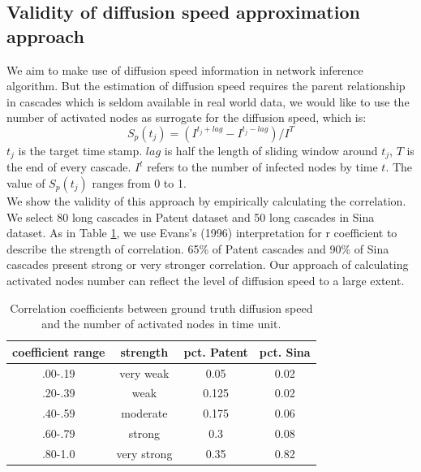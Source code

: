 \subsection{Validity of diffusion speed approximation approach}
We aim to make use of diffusion speed information in network inference algorithm. But the estimation of diffusion speed requires the parent relationship in cascades which is seldom available in real world data, we would like to use the number of activated nodes as surrogate for the diffusion speed, which is:
\begin{equation}
S_p(t_j)=(I^{t_j+lag}-I^{t_j-lag})/I^T
\end{equation}
$t_j$ is the target time stamp. $lag$ is half the length of sliding window around $t_j$, $T$ is the end of every cascade. $I^t$ refers to the number of infected nodes by time $t$. The value of $S_p(t_j)$ ranges from 0 to 1.
\\We show the validity of this approach by empirically calculating the correlation. We select 80 long cascades in Patent dataset and 50 long cascades in Sina dataset. As in Table \ref{tab:Corre}, we use Evans's (1996) interpretation for r coefficient to describe the strength of correlation. 65\% of Patent cascades and 90\% of Sina cascades present strong or very stronger correlation. Our approach of calculating activated nodes number can reflect the level of diffusion speed to a large extent.
\begin{table}[H]
\caption{Correlation coefficients between ground truth diffusion speed and the number of activated nodes in time unit.}
\begin{tabular}{c|c|c|c}
 coefficient range & strength & pct. Patent & pct. Sina \\
\hline
.00-.19 & very weak & 0.05 & 0.02\\
.20-.39 & weak & 0.125 & 0.02\\
.40-.59 & moderate & 0.175 & 0.06\\
.60-.79 & strong & 0.3 & 0.08\\
.80-1.0 & very strong & 0.35 & 0.82\\
\end{tabular}\label{tab:Corre}
\end{table}